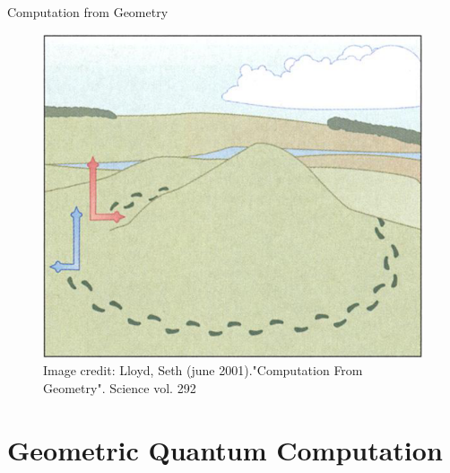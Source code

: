 \documentclass[t]{beamer}
\begin{document}
\begin{frame}{Computation from Geometry}

\begin{figure}
\begin{center}
\includegraphics[scale=0.25]{geom.png}
\captionsetup{labelformat=empty}
\caption{{\tiny Image credit: Lloyd, Seth (june 2001)."Computation From Geometry". Science vol. 292}}
\end{center}
\end{figure}


\end{frame}



\section{Geometric Quantum Computation}

\begin{frame}{}
\tableofcontents[ 
currentsubsection, 
hideothersubsections, 
sectionstyle=show/shaded, 
subsectionstyle=show/shaded, 
] 
\end{frame}
\end{document}
